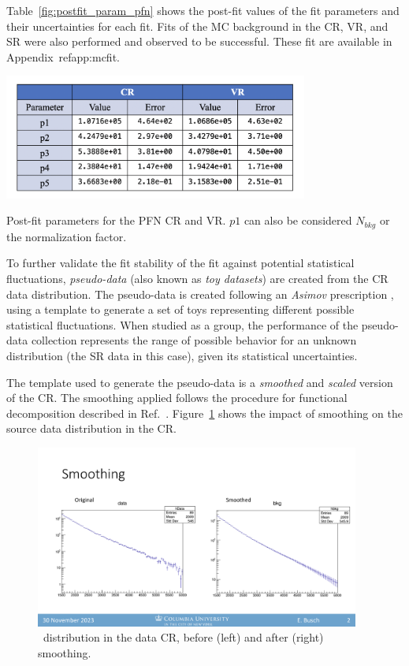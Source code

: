 Table~\ref{fig:postfit_param_pfn} shows the post-fit values of the fit parameters and their uncertainties for each fit. Fits of the MC background in the CR, VR, and SR were also performed and observed to be successful. These fit are available in Appendix~ref{app:mcfit}. 
\begin{table}[!htbp]
\centering
   \includegraphics[width=0.75\textwidth]{figures/stats/postfit_param_pfn}
    \caption{Post-fit parameters for the PFN CR and VR. $p1$ can also be considered $N_{bkg}$ or the normalization factor.
    \label{fig:postfit_param_pfn}}
\end{table}

To further validate the fit stability of the fit against potential statistical fluctuations, \textit{pseudo-data} (also known as \textit{toy datasets}) are created from the CR data distribution. 
The pseudo-data is created following an \textit{Asimov} prescription \cite{asimov}, using a template to generate a set of toys representing different possible statistical fluctuations.
When studied as a group, the performance of the pseudo-data collection represents the range of possible behavior for an unknown distribution (the SR data in this case), given its statistical uncertainties.

The template used to generate the pseudo-data is a \textit{smoothed} and \textit{scaled} version of the CR. 
The smoothing applied follows the procedure for functional decomposition described in Ref.~\cite{edgar2018functional}.
Figure~\ref{fig:smoothing} shows the impact of smoothing on the source data distribution in the CR.
\begin{figure}[!htbp]
\centering
   \includegraphics[width=0.95\textwidth]{figures/stats/smoothing}
    \caption{\mt~distribution in the data CR, before (left) and after (right) smoothing.
    \label{fig:smoothing}}
\end{figure}

